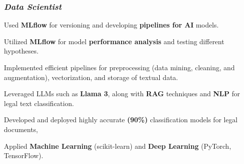 \documentclass[a4paper,12pt]{article}
\begin{document}
\subsubsection*{\normalsize \textit{Data Scientist}}
\vspace{-1.3em}
\vspace{-0.5em}
\begin{zitemize}

  \item Used \textbf{MLflow} for versioning and developing \textbf{pipelines for AI} models.  
  \item Utilized \textbf{MLflow} for model \textbf{performance analysis} and testing different hypotheses.  
  \item Implemented efficient pipelines for preprocessing (data mining, cleaning, and augmentation), vectorization, and storage of textual data.  
  \item Leveraged LLMs such as \textbf{Llama 3}, along with \textbf{RAG} techniques and \textbf{NLP} for legal text classification.  
  \item Developed and deployed highly accurate \textbf{(90\%)} classification models for legal documents,
  \item Applied \textbf{Machine Learning} (scikit-learn) and \textbf{Deep Learning} (PyTorch, TensorFlow).  
\end{zitemize}

%
%
\end{document}

